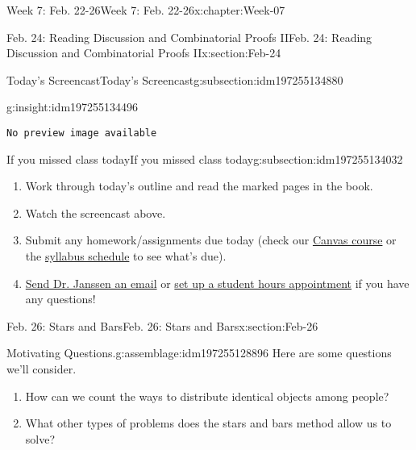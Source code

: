 \documentclass[oneside,10pt,]{book}
\newcommand{\mono}[1]{\texttt{#1}}
\numberwithin{equation}{section}
\newlength{\previewwidth}
\begin{document}
\begin{chapterptx}{Week 7: Feb. 22-26}{}{Week 7: Feb. 22-26}{}{}{x:chapter:Week-07}
\begin{sectionptx}{Feb. 24: Reading Discussion and Combinatorial Proofs II}{}{Feb. 24: Reading Discussion and Combinatorial Proofs II}{}{}{x:section:Feb-24}
\begin{subsectionptx}{Today's Screencast}{}{Today's Screencast}{}{}{g:subsection:idm197255134880}
\begin{insight}{}{g:insight:idm197255134496}
\begin{tcbraster}[raster columns=2, raster column skip=1pt, raster halign=center, raster force size=false, raster left skip=0pt, raster right skip=0pt]
\begin{tcolorbox}[previewstyle, width=\previewwidth]%
\mono{No preview image available}%
\end{tcolorbox}%
\begin{tcolorbox}[qrstyle]%
[QR LINK]\end{tcolorbox}%
\end{tcbraster}%
\end{insight}
\end{subsectionptx}
%
%
\typeout{************************************************}
\typeout{************************************************}
%
\begin{subsectionptx}{If you missed class today}{}{If you missed class today}{}{}{g:subsection:idm197255134032}
%
\begin{enumerate}
\item{}Work through today's outline and read the marked pages in the book.%
\item{}Watch the screencast above.%
\item{}Submit any homework\slash{}assignments due today (check our \href{https://dordt.instructure.com/courses/3110050}{Canvas course} or the \href{https://prof.mkjanssen.org/ds/index.html\#schedule}{syllabus schedule} to see what's due).%
\item{}\href{mailto:mike.janssen@dordt.edu}{Send Dr. Janssen an email} or \href{https://calendly.com/mkjanssen/student-hours}{set up a student hours appointment} if you have any questions!%
\end{enumerate}
\end{subsectionptx}
\end{sectionptx}
%
%
\typeout{************************************************}
\typeout{************************************************}
%
\begin{sectionptx}{Feb. 26: Stars and Bars}{}{Feb. 26: Stars and Bars}{}{}{x:section:Feb-26}
\begin{introduction}{}%
\begin{assemblage}{Motivating Questions.}{g:assemblage:idm197255128896}%
Here are some questions we'll consider. %
\begin{enumerate}
\item{}How can we count the ways to distribute identical objects among people?%
\item{}What other types of problems does the stars and bars method allow us to solve?%
\end{enumerate}

\end{assemblage}
\end{introduction}
\end{sectionptx}
\end{chapterptx}
\end{document}
